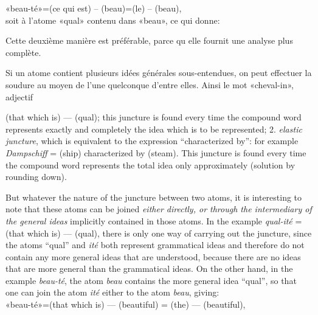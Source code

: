 \begin{sloppypar}
{{    \noindent
    «beau-té»=(ce qui est) -- (beau)=(le) -- (beau),\\[1ex]
    
    \noindent
    soit à l’atome «qual» contenu dans «beau», ce qui donne:

    \begin{center}
    \end{center}



    Cette deuxième manière est préférable, parce qu elle fournit une
    analyse plus complète.

    Si un atome contient plusieurs idées générales sous-entendues, on
    peut effectuer la soudure au moyen de l’une quelconque d’entre
    elles. Ainsi le mot «cheval-in», adjectif}

}
%
{\noindent
  {\small (that which is) --- (qual); this juncture is found every
    time the compound word represents exactly and completely the idea
    which is to be represented; 2. \emph{elastic juncture}, which is
    equivalent to the expression ``characterized by'': for example
    \emph{Dampschiff} = (ship) characterized by (steam).  This juncture
    is found every time the compound word represents the total idea
    only approximately (solution by rounding down).

    But whatever the nature of the juncture between two atoms, it is
    interesting to note that these atoms can be joined \emph{either
      directly, or through the intermediary of the general ideas}
    implicitly contained in those atoms. In the example
    \emph{qual-ité} = (that which is) --- (qual), there is only one
    way of carrying out the juncture, since the atoms ``qual'' and
    \emph{ité} both represent grammatical ideas and therefore do not
    contain any more general ideas that are understood, because there
    are no ideas that are more general than the grammatical ideas. On
    the other hand, in the example \emph{beau-té}, the atom
    \emph{beau} contains the more general idea ``qual'', so that one
    can join the atom \emph{ité}
    either to the atom \emph{beau}, giving:\\[1ex]

    \noindent   
    «beau-té»=(that which is) --- (beautiful) = (the) --- (beautiful),\\[1ex]
    
}}
\end{sloppypar}
